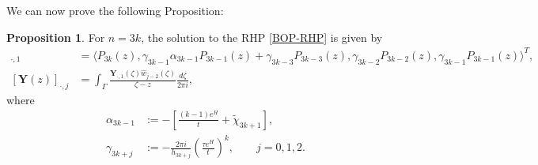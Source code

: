 \documentclass[usenames,dvipsnames]{article}
\theoremstyle{definition}
\newtheorem{prop}{Proposition}[section]
\numberwithin{equation}{section}
\numberwithin{figure}{section}
\begin{document}
We can now prove the following Proposition:
    \begin{prop}\label{RHP-determination-prop}
        For $n=3k$, the solution to the RHP \eqref{BOP-RHP} is given by
            \begin{align}
                [\boldsymbol{Y}(z)]_{\cdot,1}&= \langle P_{3k}(z), \gamma_{3k-1}\alpha_{3k-1}P_{3k-1}(z) + \gamma_{3k-3}P_{3k-3}(z),\gamma_{3k-2}P_{3k-2}(z),\gamma_{3k-1}P_{3k-1}(z)\rangle^T,\\
                [\boldsymbol{Y}(z)]_{\cdot,j}&= \int_{\Gamma} \frac{\boldsymbol{Y}_{\cdot,1}(\zeta)\hat{w}_{j-2}(\zeta)}{\zeta-z}\frac{d\zeta}{2\pi i},
            \end{align}
        where
            \begin{align}
                \alpha_{3k-1} &:= -\left[\frac{(k-1)e^H}{t} + \tilde{\chi}_{3k+1}\right],\\
                \gamma_{3k+j} &:= -\frac{2\pi i}{h_{3k+j}} \left(\frac{\tau e^H}{t}\right)^k,\qquad j=0,1,2.
            \end{align}
    \end{prop}
\end{document}
